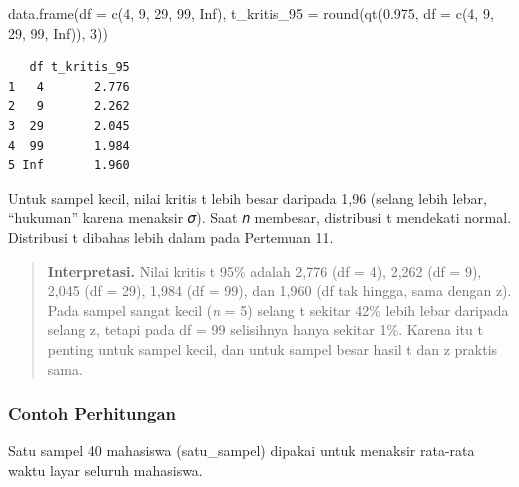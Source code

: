 \documentclass[
  indonesian,
  letterpaper,
]{book}
\newenvironment{Shaded}{\begin{snugshade}}{\end{snugshade}}
\newcommand{\AttributeTok}[1]{\textcolor[rgb]{0.40,0.45,0.13}{#1}}
\newcommand{\ConstantTok}[1]{\textcolor[rgb]{0.56,0.35,0.01}{#1}}
\newcommand{\DecValTok}[1]{\textcolor[rgb]{0.68,0.00,0.00}{#1}}
\newcommand{\FloatTok}[1]{\textcolor[rgb]{0.68,0.00,0.00}{#1}}
\newcommand{\FunctionTok}[1]{\textcolor[rgb]{0.28,0.35,0.67}{#1}}
\newcommand{\NormalTok}[1]{\textcolor[rgb]{0.00,0.23,0.31}{#1}}
\begin{document}
\begin{Shaded}
\begin{Highlighting}[]
\FunctionTok{data.frame}\NormalTok{(}\AttributeTok{df =} \FunctionTok{c}\NormalTok{(}\DecValTok{4}\NormalTok{, }\DecValTok{9}\NormalTok{, }\DecValTok{29}\NormalTok{, }\DecValTok{99}\NormalTok{, }\ConstantTok{Inf}\NormalTok{),}
\AttributeTok{t\_kritis\_95 =} \FunctionTok{round}\NormalTok{(}\FunctionTok{qt}\NormalTok{(}\FloatTok{0.975}\NormalTok{, }\AttributeTok{df =} \FunctionTok{c}\NormalTok{(}\DecValTok{4}\NormalTok{, }\DecValTok{9}\NormalTok{, }\DecValTok{29}\NormalTok{, }\DecValTok{99}\NormalTok{, }\ConstantTok{Inf}\NormalTok{)), }\DecValTok{3}\NormalTok{))}
\end{Highlighting}
\end{Shaded}

\begin{verbatim}
   df t_kritis_95
1   4       2.776
2   9       2.262
3  29       2.045
4  99       1.984
5 Inf       1.960
\end{verbatim}

Untuk sampel kecil, nilai kritis t lebih besar daripada 1,96 (selang
lebih lebar, ``hukuman'' karena menaksir 𝜎). Saat 𝑛 membesar, distribusi
t mendekati normal. Distribusi t dibahas lebih dalam pada Pertemuan 11.

\begin{quote}
\textbf{Interpretasi.} Nilai kritis t 95\% adalah 2,776 (df = 4), 2,262
(df = 9), 2,045 (df = 29), 1,984 (df = 99), dan 1,960 (df tak hingga,
sama dengan z). Pada sampel sangat kecil (\emph{n} = 5) selang t sekitar
42\% lebih lebar daripada selang z, tetapi pada df = 99 selisihnya hanya
sekitar 1\%. Karena itu t penting untuk sampel kecil, dan untuk sampel
besar hasil t dan z praktis sama.
\end{quote}

\subsubsection{Contoh Perhitungan}\label{contoh-perhitungan}

Satu sampel 40 mahasiswa (satu\_sampel) dipakai untuk menaksir rata-rata
waktu layar seluruh mahasiswa.
\end{document}
